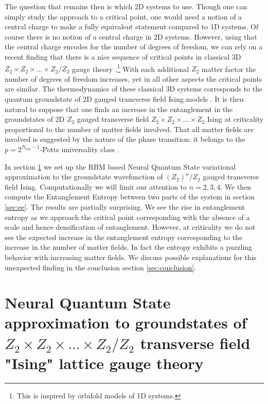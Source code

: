 The question that remains then is which 2D systems to use. Though one can simply study the approach to a critical point, one would need a notion of a central charge to make a fully equivalent statement compared to 1D systems. Of course there is no notion of a central charge in 2D systems. However, using that the central charge encodes for the number of degrees of freedom, we can rely on a recent finding that there is a nice sequence of critical points in classical 3D $Z_2\times Z_2 \times \ldots \times Z_2/Z_2$ gauge theory \cite{Bukva:Registry}.\footnote{This is inspired by orbifold models of 1D systems.} With each additional $Z_2$ matter factor the number of degrees of freedom increases, yet in all other aspects the critical points are similar. The thermodynamics of these classical 3D systems corresponds to the quantum groundstate of 2D gauged transverse field Ising models \cite{transferMatrix1978,fradkinPhaseDiagramsLattice1979,RevModPhys.51.659}. It is then natural to suppose that one finds an increase in the entanglement in the groundstates of 2D $Z_2$ gauged transverse field $Z_2\times Z_2 \times \ldots \times Z_2$ Ising at criticality proportional to the number of matter fields involved. That all matter fields are involved is suggested by the nature of the phase transition: it belongs to the $p=2^{N_{\text{rep}}-1}$-Potts universality class \cite{Bukva:Registry}.

In section \ref{sec:lat-gauge} we set up the RBM based Neural Quantum State variational approximation to the groundstate wavefunction of $(Z_2)^n/Z_2$ gauged transverse field Ising. Computationally we will limit our attention to $n=2,3,4$. We then compute the Entanglement Entropy between two parts of the system in section \ref{sec:ee}. The results are partially surprising. We see the rise in entanglement entropy as we approach the critical point corresponding with the absence of a scale and hence densification of entanglement. However, at criticality we do not see the expected increase in the entanglement entropy corresponding to the increase in the number of matter fields. In fact the entropy exhibits a puzzling behavior with increasing matter fields.
We discuss possible explanations for this unexpected finding in the conclusion section \ref{sec:conclusion}.

\section{Neural Quantum State approximation to groundstates of $Z_2\times Z_2 \times \ldots \times Z_2/Z_2$ transverse field "Ising" lattice gauge theory}
\label{sec:lat-gauge}

